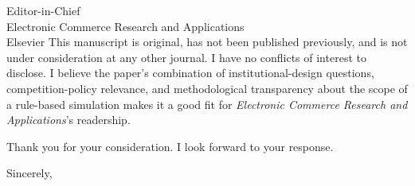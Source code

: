 \documentclass[12pt]{letter}
\begin{document}
\begin{letter}{Editor-in-Chief \\ Electronic Commerce Research and Applications \\ Elsevier}
This manuscript is original, has not been published previously, and is not under consideration at any other journal. I have no conflicts of interest to disclose. I believe the paper's combination of institutional-design questions, competition-policy relevance, and methodological transparency about the scope of a rule-based simulation makes it a good fit for \emph{Electronic Commerce Research and Applications}'s readership.

Thank you for your consideration. I look forward to your response.

\closing{Sincerely,}

\end{letter}
\end{document}
